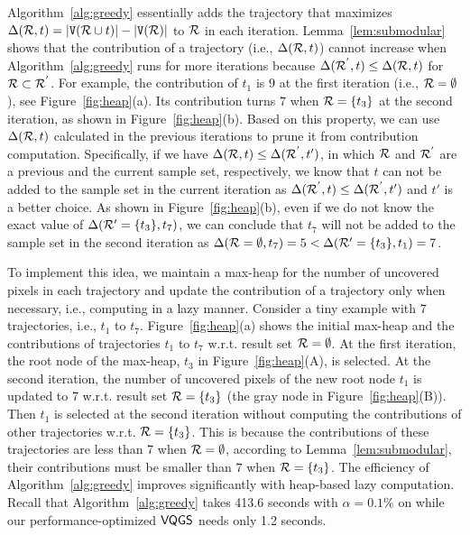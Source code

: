 Algorithm~\ref{alg:greedy} essentially adds the trajectory that maximizes $\Delta(\mathcal{R}, t) = |\mathtt{V}(\mathcal{R} \cup t)| - |\mathtt{V}(\mathcal{R})|$ to $\mathcal{R}$ in each iteration.
Lemma~\ref{lem:submodular} shows that the contribution of a trajectory (i.e., $\Delta(\mathcal{R}, t)$) cannot increase when Algorithm~\ref{alg:greedy} runs for more iterations because $ \Delta(\mathcal{R}^{'}, t) \le \Delta(\mathcal{R}, t) $ for  $\mathcal{R} \subset \mathcal{R}^{'}$.
For example, the contribution of $t_1$ is $9$ at the first iteration (i.e., $\mathcal{R} = \emptyset$), see Figure~\ref{fig:heap}(a).
Its contribution turns $7$ when $\mathcal{R} = \{ t_3 \}$ at the second iteration, as shown in Figure~\ref{fig:heap}(b).
Based on this property, we can use  $\Delta(\mathcal{R}, t)$ calculated in the previous iterations to prune it from contribution computation.
Specifically, if we have $\Delta(\mathcal{R}, t) \le \Delta(\mathcal{R}^{'}, t')$, in which $\mathcal{R}$ and $\mathcal{R}^{'}$ are a previous and the current sample set, respectively,
we know that $t$ can not be added to the sample set in the current iteration as $\Delta(\mathcal{R}^{'}, t)\le \Delta(\mathcal{R}^{'}, t')$ and $t'$ is a better choice.
As shown in Figure~\ref{fig:heap}(b), even if we do not know the exact value of $\Delta(\mathcal{R}'=\{t_3\}, t_7)$,
we can conclude that $t_7$ will not be added to the sample set in the second iteration as $\Delta(\mathcal{R} = \emptyset, t_7) = 5 < \Delta(\mathcal{R}'=\{t_3\}, t_1) = 7$.


To implement this idea, we maintain a max-heap for the number of uncovered pixels in each trajectory and update the contribution of a trajectory only when necessary, i.e., computing in a lazy manner. Consider a tiny example with 7 trajectories, i.e., $t_1$ to $t_7$.
Figure~\ref{fig:heap}(a) shows the initial max-heap and the contributions of trajectories $t_1$ to $t_7$ w.r.t. result set $\mathcal{R} = \emptyset$.
At the first iteration, the root node of the max-heap, $t_3$ in Figure~\ref{fig:heap}(A), is selected.
At the second iteration, the number of uncovered pixels of the new root node $t_1$ is updated to 7 w.r.t. result set $\mathcal{R} = \{ t_3 \}$ (the gray node in Figure~\ref{fig:heap}(B)).
Then $t_1$ is selected at the second iteration without computing the contributions of other trajectories w.r.t. $\mathcal{R} = \{ t_3 \}$.
This is because the contributions of these trajectories are less than 7 when $\mathcal{R} = \emptyset$,
according to Lemma~\ref{lem:submodular}, their contributions must be smaller than $7$ when $\mathcal{R} = \{ t_3 \}$.
The efficiency of Algorithm~\ref{alg:greedy} improves significantly with heap-based lazy computation.
Recall that Algorithm~\ref{alg:greedy} takes 413.6 seconds with $\alpha=0.1\%$ on \pt{} while our performance-optimized $\mathsf{VQGS}$ needs only 1.2 seconds.

